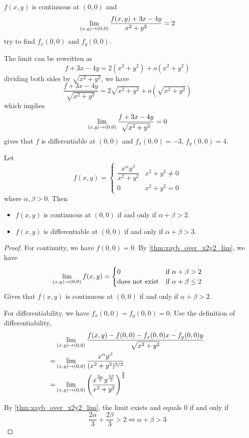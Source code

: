 \documentclass[a4]{overview}
\begin{document}
\begin{example}
	$f(x, y)$ is continuous at $(0, 0)$ and
	\[
		\lim_{(x, y)\to(0, 0)} \frac{f(x,y) + 3x - 4y}{x^2 + y^2} = 2
	\]
	try to find $f_x(0, 0)$ and $f_y(0, 0)$.
	\begin{answer}
		The limit can be rewritten as
		\[
			f + 3x - 4y = 2(x^2 + y^2) + o(x^2+y^2)
		\]
		dividing both sides by $\sqrt{x^2 + y^2}$, we have
		\[
			\frac{f + 3x - 4y}{\sqrt{x^2 + y^2}} = 2\sqrt{x^2 + y^2} + o(\sqrt{x^2 + y^2}) 
		\] 
		which implies
		\[
			\lim_{(x, y)\to(0, 0)} \frac{f + 3x - 4y}{\sqrt{x^2 + y^2}} = 0
		\] 
		gives that $f$ is differentiable at $(0, 0)$ and $f_x(0, 0) = -3$, $f_y(0, 0) = 4$.
	\end{answer}
\end{example}

\begin{theorem}
	Let
	\[
	f(x,y) = \begin{cases}
		\dfrac{x^{\alpha}y^{\beta}}{x^2+y^2} & x^2+y^2 \neq 0 \\
		0 & x^2+y^2 = 0
	\end{cases}
	\]
	where $\alpha, \beta > 0$. Then
		\begin{itemize}
			\item $f(x,y)$ is continuous at $(0,0)$ if and only if $\alpha + \beta > 2$.
			\item $f(x,y)$ is differentiable at $(0,0)$ if and only if $\alpha + \beta > 3$.
		\end{itemize}
\end{theorem}

\begin{proof}
	For continuity, we have $f(0,0) = 0$. By \ref{thm:xayb_over_x2y2_lim}, we have
		\[
			\lim_{(x, y)\to(0, 0)} f(x,y) = \begin{cases}
				0 & \text{if } \alpha + \beta > 2 \\
				\text{does not exist} & \text{if } \alpha + \beta \leq 2
			\end{cases}
		\] 
	Gives that $f(x,y)$ is continuous at $(0,0)$ if and only if $\alpha + \beta > 2$.
		
		For differentiability, we have $f_x(0,0) = f_y(0,0) = 0$. Use the definition
		of differentiability,
		\begin{align*}
			& \lim_{(x, y)\to(0, 0)} \frac{f(x,y) - f(0,0) - f_x(0,0) x - f_y(0,0) y}{\sqrt{x^2 + y^2}} \\
			=& \lim_{(x, y)\to(0, 0)} \frac{x^{\alpha}y^{\beta}}{(x^2+y^2)^{3/2}}\\
			=& \lim_{(x, y)\to(0, 0)} \left( \frac{x^{\frac{2\alpha}{3}}y^{\frac{2\beta}{3}}}{x^2+y^2} \right)^{\frac{3}{2}}\\
		\end{align*}

	By \ref{thm:xayb_over_x2y2_lim}, the limit exists and equals $0$ if and only if
	\[
		\frac{2\alpha}{3} + \frac{2\beta}{3} > 2 \iff \alpha + \beta > 3
	\] 

\end{proof}
\end{document}
